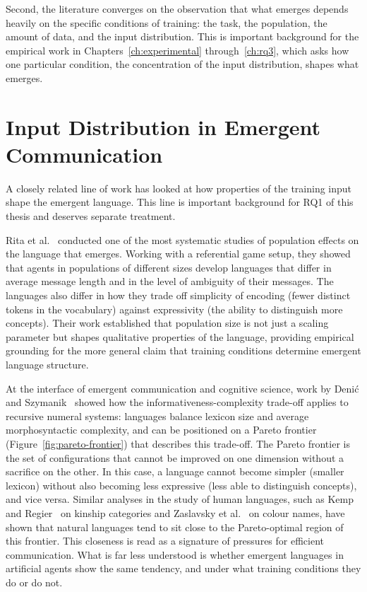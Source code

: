 Second, the literature converges on the observation that what emerges depends heavily on the specific conditions of training: the task, the population, the amount of data, and the input distribution. This is important background for the empirical work in Chapters~\ref{ch:experimental} through~\ref{ch:rq3}, which asks how one particular condition, the concentration of the input distribution, shapes what emerges.

\section{Input Distribution in Emergent Communication}
\label{sec:bg-input-distribution}

A closely related line of work has looked at how properties of the training input shape the emergent language. This line is important background for RQ1 of this thesis and deserves separate treatment.

Rita et al.~\cite{rita_role_2022} conducted one of the most systematic studies of population effects on the language that emerges. Working with a referential game setup, they showed that agents in populations of different sizes develop languages that differ in average message length and in the level of ambiguity of their messages. The languages also differ in how they trade off simplicity of encoding (fewer distinct tokens in the vocabulary) against expressivity (the ability to distinguish more concepts). Their work established that population size is not just a scaling parameter but shapes qualitative properties of the language, providing empirical grounding for the more general claim that training conditions determine emergent language structure.

At the interface of emergent communication and cognitive science, work by Denić and Szymanik~\cite{denic_recursive_2024} showed how the informativeness-complexity trade-off applies to recursive numeral systems: languages balance lexicon size and average morphosyntactic complexity, and can be positioned on a Pareto frontier (Figure~\ref{fig:pareto-frontier}) that describes this trade-off. The Pareto frontier is the set of configurations that cannot be improved on one dimension without a sacrifice on the other. In this case, a language cannot become simpler (smaller lexicon) without also becoming less expressive (less able to distinguish concepts), and vice versa. Similar analyses in the study of human languages, such as Kemp and Regier~\cite{kemp_kinship_2012} on kinship categories and Zaslavsky et al.~\cite{zaslavsky_efficient_2018} on colour names, have shown that natural languages tend to sit close to the Pareto-optimal region of this frontier. This closeness is read as a signature of pressures for efficient communication. What is far less understood is whether emergent languages in artificial agents show the same tendency, and under what training conditions they do or do not.

